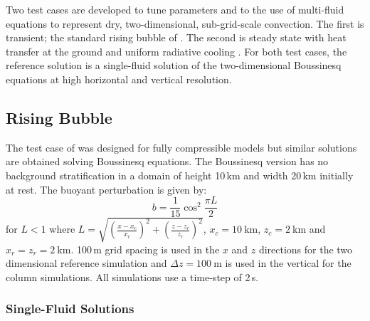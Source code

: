 \documentclass[draft]{agujournal2019}
\begin{document}
Two test cases are developed to tune parameters and to  the
use of multi-fluid equations to represent dry, two-dimensional, sub-grid-scale
convection. The first is transient; the standard rising bubble of
.  The second  is steady state with heat transfer at
the ground and uniform radiative cooling . For both test cases, the
reference solution is a single-fluid solution of the two-dimensional
Boussinesq equations at high horizontal and vertical resolution. 

\subsection{Rising Bubble}

The  test case of  was designed for fully compressible
models but similar solutions are obtained solving Boussinesq equations.
The Boussinesq version has no background stratification in a domain
of height 10\,km and width 20\,km initially at rest. The buoyant
perturbation is given by:
\begin{equation}
b=\frac{1}{15}\cos^{2}\frac{\pi L}{2}\label{eq:thetaPerturb}
\end{equation}
for $L<1$ where $L=\sqrt{\left(\frac{x-x_{c}}{x_{r}}\right)^{2}+\left(\frac{z-z_{c}}{z_{r}}\right)^{2}}$,
$x_{c}=10\ \text{km}$, $z_{c}=2\ \text{km}$ and $x_{r}=z_{r}=2\ \text{km}$.
100\,m grid spacing is used in the $x$ and $z$ directions for the
two dimensional reference simulation and $\Delta z=100\ \text{m}$
is used in the vertical for the  column simulations. All simulations
use a time-step of 2\,s.

\subsubsection{Single-Fluid Solutions}
\end{document}
